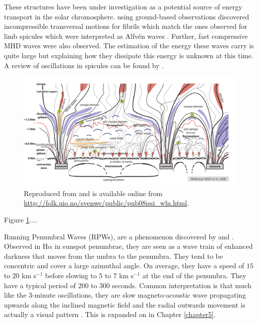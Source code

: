     These structures have been under investigation as a potential source of energy transport in the solar chromosphere.
    \cite{Morton2012} using ground-based observations discovered incompressible transversal motions for fibrils which match the ones observed for limb spicules which were interpreted as Alfv\'en waves \citep{DePontieu2007}.
    Further, fast compressive MHD waves were also observed.
    The estimation of the energy these waves carry is quite large but explaining how they dissipate this energy is unknown at this time.
    A review of oscillations in spicules can be found by \cite{Zaqarashvili2009}. 

    \begin{figure}
    	\centering
    	\includegraphics[width=\textwidth]{internetwork_sketch.pdf}
    	\caption{
		    	Reproduced from \cite{Sven} and is available online from \url{http://folk.uio.no/svenwe/public/pub08issi_wln.html}.
		    	}
    	\label{fig:chromo_field}
    \end{figure}
            
    Figure \ref{fig:chromo_field}....
      
    Running Penumbral Waves (RPWs), are a phenomenon discovered by \cite{Zirin1972} and \cite{Giovanelli1972}. 
    Observed in H$\alpha$ in sunspot penumbrae, they are seen as a wave train of enhanced darkness that moves from the umbra to the penumbra.
    They tend to be concentric and cover a large azimuthal angle.
    On average, they have a speed of $15$ to $20$ km s$^{-1}$ before slowing to $5$ to $7$ km s$^{-1}$ at the end of the penumbra.
    They have a typical period of $200$ to $300$ seconds. 
    Common interpretation is that much like the $3$-minute oscillations, they are slow magneto-acoustic wave propagating upwards along the inclined magnetic field and the radial outwards movement is actually a visual pattern \citep{UTMO,ORWS,OASO}.
    This is expanded on in Chapter \ref{chapter5}.
    
